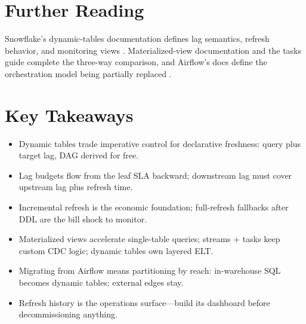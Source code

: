 \section{Further Reading}
Snowflake's dynamic-tables documentation defines lag semantics, refresh behavior, and monitoring views \cite{snowflakeDynamicTablesDocs}. Materialized-view documentation \cite{snowflakeMaterializedViewsDocs} and the tasks guide \cite{snowflakeTasksDocs} complete the three-way comparison, and Airflow's docs define the orchestration model being partially replaced \cite{airflowDocs}.

\section*{Key Takeaways}
\begin{itemize}
    \item Dynamic tables trade imperative control for declarative freshness: query plus target lag, DAG derived for free.
    \item Lag budgets flow from the leaf SLA backward; downstream lag must cover upstream lag plus refresh time.
    \item Incremental refresh is the economic foundation; full-refresh fallbacks after DDL are the bill shock to monitor.
    \item Materialized views accelerate single-table queries; streams + tasks keep custom CDC logic; dynamic tables own layered ELT.
    \item Migrating from Airflow means partitioning by reach: in-warehouse SQL becomes dynamic tables; external edges stay.
    \item Refresh history is the operations surface---build its dashboard before decommissioning anything.
\end{itemize}

